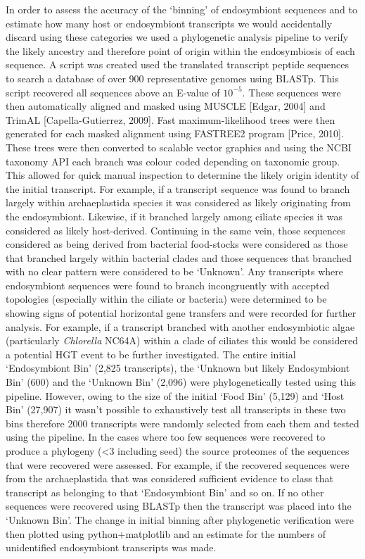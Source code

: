 In order to assess the accuracy of the `binning' of endosymbiont sequences and to estimate how many host or endosymbiont transcripts we would accidentally discard using these categories we used a phylogenetic analysis pipeline to verify the likely ancestry and therefore point of origin within the endosymbiosis of each sequence.  
A script was created used the translated transcript peptide sequences to search a database of over 900 representative genomes using BLASTp.  This script recovered all sequences above an E-value of $10^{-5}$. 
These sequences were then automatically aligned and masked using MUSCLE [Edgar, 2004] and TrimAL [Capella-Gutierrez, 2009]. 
Fast maximum-likelihood trees were then generated for each masked alignment using FASTREE2 program [Price, 2010].  
These trees were then converted to scalable vector graphics and using the NCBI taxonomy API each branch was colour coded depending on taxonomic group.  
This allowed for quick manual inspection to determine the likely origin identity of the initial transcript.  
For example, if a transcript sequence was found to branch largely within archaeplastida species it was considered as likely originating from the endosymbiont.  
Likewise, if it branched largely among ciliate species it was considered as likely host-derived.  
Continuing in the same vein, those sequences considered as being derived from bacterial food-stocks were considered as those that branched largely within bacterial clades and those sequences that branched with no clear pattern were considered to be `Unknown'.  
Any transcripts where endosymbiont sequences were found to branch incongruently with accepted topologies (especially within the ciliate or bacteria) were determined to be showing signs of potential horizontal gene transfers and were recorded for further analysis.  
For example, if a transcript branched with another endosymbiotic algae (particularly \textit{Chlorella} NC64A) within a clade of ciliates this would be considered a potential HGT event to be further investigated.
The entire initial `Endosymbiont Bin' (2,825 transcripts), the `Unknown but likely Endosymbiont Bin' (600) and the `Unknown Bin' (2,096) were phylogenetically tested using this pipeline.  
However, owing to the size of the initial `Food Bin' (5,129) and `Host Bin' (27,907) it wasn't possible to exhaustively test all transcripts in these two bins therefore 2000 transcripts were randomly selected from each them and tested using the pipeline. 
In the cases where too few sequences were recovered to produce a phylogeny (<3 including seed) the source proteomes of the sequences that were recovered were assessed. For example, if the recovered sequences were from the archaeplastida that was considered sufficient evidence to class that transcript as belonging to that `Endosymbiont Bin' and so on.  If no other sequences were recovered using BLASTp then the transcript was placed into the `Unknown Bin'.
The change in initial binning after phylogenetic verification were then plotted using python+matplotlib and an estimate for the numbers of unidentified endosymbiont transcripts was made.

